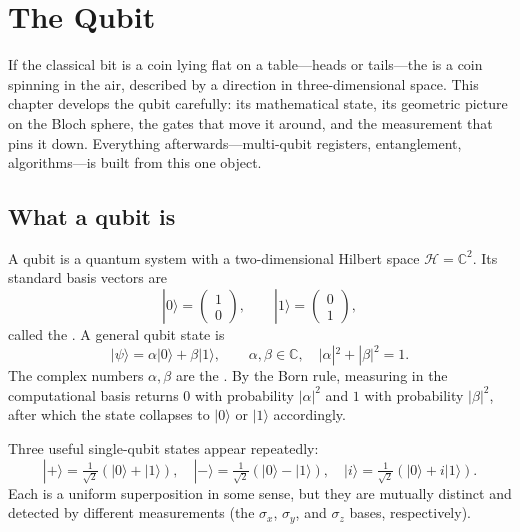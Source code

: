 \chapter{The Qubit}


If the classical bit is a coin lying flat on a table---heads or tails---the  is a coin spinning in the air, described by a direction in three-dimensional space. This chapter develops the qubit carefully: its mathematical state, its geometric picture on the Bloch sphere, the gates that move it around, and the measurement that pins it down. Everything afterwards---multi-qubit registers, entanglement, algorithms---is built from this one object.

\section{What a qubit is}

A qubit is a quantum system with a two-dimensional Hilbert space $\mathcal{H} = \mathbb{C}^2$. Its standard basis vectors are
\[
  |0\rangle = \begin{pmatrix}1\\0\end{pmatrix}, \qquad |1\rangle = \begin{pmatrix}0\\1\end{pmatrix},
\]
called the . A general qubit state is
\[
  |\psi\rangle = \alpha|0\rangle + \beta|1\rangle, \qquad \alpha,\beta\in\mathbb{C}, \quad |\alpha|^2+|\beta|^2 = 1.
\]
The complex numbers $\alpha,\beta$ are the . By the Born rule, measuring in the computational basis returns $0$ with probability $|\alpha|^2$ and $1$ with probability $|\beta|^2$, after which the state collapses to $|0\rangle$ or $|1\rangle$ accordingly.

\begin{example}
Three useful single-qubit states appear repeatedly:
\[
  |+\rangle = \tfrac{1}{\sqrt 2}(|0\rangle+|1\rangle), \quad
  |-\rangle = \tfrac{1}{\sqrt 2}(|0\rangle-|1\rangle), \quad
  |i\rangle = \tfrac{1}{\sqrt 2}(|0\rangle+i|1\rangle).
\]
Each is a uniform superposition in some sense, but they are mutually distinct and detected by different measurements (the $\sigma_x$, $\sigma_y$, and $\sigma_z$ bases, respectively).
\end{example}

